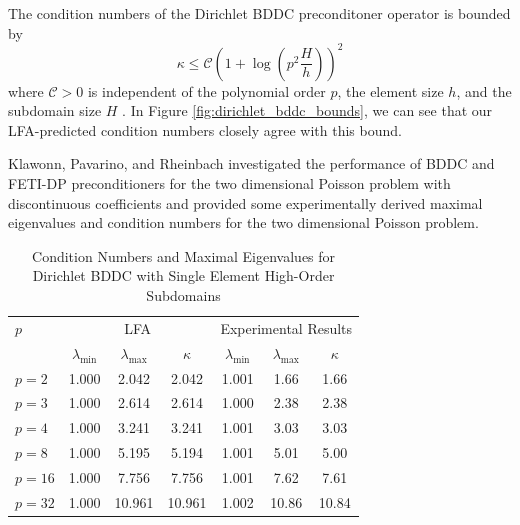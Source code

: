 The condition numbers of the Dirichlet BDDC preconditoner operator is bounded by
\begin{equation}
\kappa \leq \mathcal{C} \left( 1 + \log \left( p^2 \frac{H}{h} \right) \right)^2
\end{equation}
where $\mathcal{C} > 0$ is independent of the polynomial order $p$, the element size $h$, and the subdomain size $H$ \cite{klawonn2008spectral}.
In Figure \ref{fig:dirichlet_bddc_bounds}, we can see that our LFA-predicted condition numbers closely agree with this bound.

Klawonn, Pavarino, and Rheinbach investigated the performance of BDDC and FETI-DP preconditioners for the two dimensional Poisson problem with discontinuous coefficients \cite{klawonn2008spectral} and provided some experimentally derived maximal eigenvalues and condition numbers for the two dimensional Poisson problem.

\begin{table}[ht!]
\begin{center}
\begin{tabular}{l ccc ccc}
  \toprule
  $p$  &  \multicolumn{3}{c}{LFA}  &  \multicolumn{3}{c}{Experimental Results}  \\
                      &  $\lambda_{\text{min}}$  &  $\lambda_{\text{max}}$  &  $\kappa$ & $\lambda_{\text{min}}$  &  $\lambda_{\text{max}}$ & $\kappa$  \\
  \toprule
  $p = 2$   &  1.000  &   2.042  &   2.042  &  1.001  &   1.66  &   1.66  \\
  $p = 3$   &  1.000  &   2.614  &   2.614  &  1.000  &   2.38  &   2.38  \\
  $p = 4$   &  1.000  &   3.241  &   3.241  &  1.001  &   3.03  &   3.03  \\
  $p = 8$   &  1.000  &   5.195  &   5.194  &  1.001  &   5.01  &   5.00  \\
  $p = 16$  &  1.000  &   7.756  &   7.756  &  1.001  &   7.62  &   7.61  \\
  $p = 32$  &  1.000  &  10.961  &  10.961  &  1.002  &  10.86  &  10.84  \\
  \bottomrule
\end{tabular}
\end{center}
\caption{Condition Numbers and Maximal Eigenvalues for Dirichlet BDDC with Single Element High-Order Subdomains}
\label{table:high_order_bddc_experiments_1}
\end{table}

